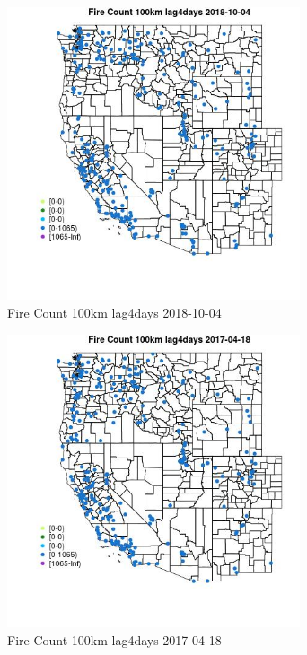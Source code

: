 \begin{figure} 
\centering  
\includegraphics[width=0.77\textwidth]{Code_Outputs/Report_ML_input_PM25_Step4_part_f_de_duplicated_aves_prioritize_24hr_obswNAs_MapObsFire_Count_100km_lag4days2018-10-04.jpg} 
\caption{\label{fig:Report_ML_input_PM25_Step4_part_f_de_duplicated_aves_prioritize_24hr_obswNAsMapObsFire_Count_100km_lag4days2018-10-04}Fire Count 100km lag4days 2018-10-04} 
\end{figure} 
 

\clearpage 

\begin{figure} 
\centering  
\includegraphics[width=0.77\textwidth]{Code_Outputs/Report_ML_input_PM25_Step4_part_f_de_duplicated_aves_prioritize_24hr_obswNAs_MapObsFire_Count_100km_lag4days2017-04-18.jpg} 
\caption{\label{fig:Report_ML_input_PM25_Step4_part_f_de_duplicated_aves_prioritize_24hr_obswNAsMapObsFire_Count_100km_lag4days2017-04-18}Fire Count 100km lag4days 2017-04-18} 
\end{figure} 
 

